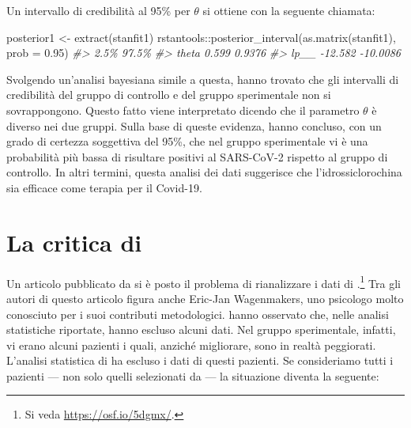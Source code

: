 \documentclass[
  11pt,
]{krantz}
\makeatletter
\newenvironment{Shaded}{\begin{snugshade}}{\end{snugshade}}
\newcommand{\AttributeTok}[1]{\textcolor[rgb]{0.61,0.61,0.61}{#1}}
\newcommand{\CommentTok}[1]{\textcolor[rgb]{0.37,0.37,0.37}{\textit{#1}}}
\newcommand{\FloatTok}[1]{\textcolor[rgb]{0.06,0.06,0.06}{#1}}
\newcommand{\FunctionTok}[1]{\textcolor[rgb]{0,0,0}{#1}}
\newcommand{\NormalTok}[1]{#1}
\newcommand{\OtherTok}[1]{\textcolor[rgb]{0.37,0.37,0.37}{#1}}
\newcommand{\SpecialCharTok}[1]{\textcolor[rgb]{0,0,0}{#1}}
\newenvironment{kframe}{%
\medskip{}
\setlength{\fboxsep}{.8em}
 \def\at@end@of@kframe{}%
 \ifinner\ifhmode%
  \def\at@end@of@kframe{\end{minipage}}%
  \begin{minipage}{\columnwidth}%
 \fi\fi%
 \def\FrameCommand##1{\hskip\@totalleftmargin \hskip-\fboxsep
 \colorbox{shadecolor}{##1}\hskip-\fboxsep
     \hskip-\linewidth \hskip-\@totalleftmargin \hskip\columnwidth}%
 \MakeFramed {\advance\hsize-\width
   \@totalleftmargin\z@ \linewidth\hsize
   \@setminipage}}%
 {\par\unskip\endMakeFramed%
 \at@end@of@kframe}
\renewenvironment{Shaded}{\begin{kframe}}{\end{kframe}}
\theoremstyle{definition}
\theoremstyle{definition}
\theoremstyle{definition}
\theoremstyle{definition}
\theoremstyle{remark}
\makeatother
\begin{document}
Un intervallo di credibilità al 95\% per \(\theta\) si ottiene con la seguente chiamata:

\begin{Shaded}
\begin{Highlighting}[]
\NormalTok{posterior1 }\OtherTok{\textless{}{-}} \FunctionTok{extract}\NormalTok{(stanfit1)}
\NormalTok{rstantools}\SpecialCharTok{::}\FunctionTok{posterior\_interval}\NormalTok{(}\FunctionTok{as.matrix}\NormalTok{(stanfit1), }\AttributeTok{prob =} \FloatTok{0.95}\NormalTok{)}
\CommentTok{\#\textgreater{}          2.5\%    97.5\%}
\CommentTok{\#\textgreater{} theta   0.599   0.9376}
\CommentTok{\#\textgreater{} lp\_\_  {-}12.582 {-}10.0086}
\end{Highlighting}
\end{Shaded}

Svolgendo un'analisi bayesiana simile a questa, \citet{Gautret_2020} hanno trovato che gli intervalli di credibilità del gruppo di controllo e del gruppo sperimentale non si sovrappongono. Questo fatto viene interpretato dicendo che il parametro \(\theta\) è diverso nei due gruppi. Sulla base di queste evidenza, \citet{Gautret_2020} hanno concluso, con un grado di certezza soggettiva del 95\%, che nel gruppo sperimentale vi è una probabilità più bassa di risultare positivi al SARS-CoV-2 rispetto al gruppo di controllo. In altri termini, questa analisi dei dati suggerisce che l'idrossiclorochina sia efficace come terapia per il Covid-19.

\hypertarget{la-critica-di-hulme_2020}{%
\section{\texorpdfstring{La critica di \citet{Hulme_2020}}{La critica di @Hulme\_2020}}\label{la-critica-di-hulme_2020}}

Un articolo pubblicato da \citet{Hulme_2020} si è posto il problema di rianalizzare i dati di \citet{Gautret_2020}.\footnote{Si veda \url{https://osf.io/5dgmx/}.} Tra gli autori di questo articolo figura anche Eric-Jan Wagenmakers, uno psicologo molto conosciuto per i suoi contributi metodologici. \citet{Hulme_2020} hanno osservato che, nelle analisi statistiche riportate, \citet{Gautret_2020} hanno escluso alcuni dati. Nel gruppo sperimentale, infatti, vi erano alcuni pazienti i quali, anziché migliorare, sono in realtà peggiorati. L'analisi statistica di \citet{Gautret_2020} ha escluso i dati di questi pazienti. Se consideriamo tutti i pazienti --- non solo quelli selezionati da \citet{Gautret_2020} --- la situazione diventa la seguente:
\end{document}
